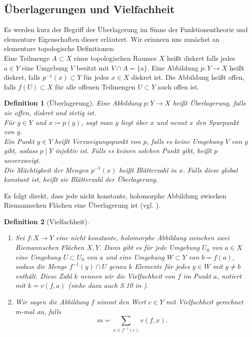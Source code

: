 \documentclass[11pt,a4paper,toc=bibliography]{scrartcl}
\theoremstyle{def}
\newtheorem{defi}{Definition}[section]
\theoremstyle{thm}
\theoremstyle{remark}
\begin{document}
\subsection{Überlagerungen und Vielfachheit}
Es werden kurz der Begriff der Überlagerung im Sinne der Funktionentheorie und elementare Eigenschaften dieser erläutert. Wir erinnern uns zunächst an elementare topologische Definitionen:\\
Eine Teilmenge $A\subset X$ eines topologischen Raumes $X$ heißt diskret falls jedes $a\in Y$ eine Umgebung $V$ besitzt mit $V\cap A= \{a\}$. Eine Abbildung $p:Y\rightarrow X$ heißt diskret, falls $p^{-1}(x)\subset Y$  für jedes $x\in X$ diskret ist. Die Abbildung heißt offen, falls $f(U)\subset X$ für alle offenen Teilmengen $U\subset Y$ auch offen ist.
\begin{defi}[Überlagerung]
Eine Abbildung $p:Y\rightarrow X$ heißt \emph{Überlagerung}, falls sie offen, diskret und stetig ist.\\
Für $y\in Y$ und $x\coloneqq p(y)$, sagt man \emph{$y$ liegt über $x$} und nennt $x$ den \emph{Spurpunkt} von $y$.\\
Ein Punkt $y\in Y$ heißt \emph{Verzweigungspunkt} von $p$, falls es keine Umgebung $V$ von $y$ gibt, sodass $p\mid Y$ injektiv ist. Falls es keinen solchen Punkt gibt, heißt $p$ \emph{unverzweigt}.\\
Die Mächtigkeit der Mengen $p^{-1}(x)$ heißt \emph{Blätterzahl in $x$}. Falls diese global konstant ist, heißt sie \emph{Blätterzahl} der Überlagerung.
\end{defi}
Es folgt direkt, dass jede nicht konstante, holomorphe Abbildung zwischen Riemannschen Flächen eine Überlagerung ist (vgl. \cite[~S.18]{forster}).


\begin{defi}[Vielfachheit]
\begin{enumerate}
    \item
    Sei $f:X\rightarrow Y$ eine nicht konstante, holomorphe Abbildung zwischen zwei Riemannschen Flächen $X,Y$. Dann gibt es für jede Umgebung $U_0$ von $a\in X$ eine Umgebung $U\subset U_0$ von $a$ und eine Umgebung $W\subset Y$ von $b=f(a)$, sodass die Menge $f^{-1}(y)\cap U$ genau $k$ Elemente für jedes $y\in W$ mit $y\neq b$ enthält. Diese Zahl $k$ nennen wir die \emph{Vielfachheit} von $f$ im Punkt $a$, notiert mit $k=v(f,a)$ (siehe dazu auch S.10 in \cite{forster}).
    \item
    Wir sagen die Abbildung $f$ nimmt den Wert $c\in Y$ \emph{mit Vielfachheit gerechnet m-mal} an, falls
    \[
    m =\sum_{x\in f^{-1}(c)} v(f,x).
    \]
    \end{enumerate}
\end{defi}
\end{document}
